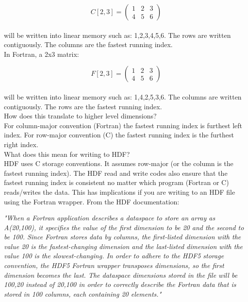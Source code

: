 \documentclass[12pt, letterpaper]{article}
\begin{document}
\[
C[2,3] =
\begin{pmatrix}
1 & 2 & 3 \\
4 & 5 & 6
\end{pmatrix}
\] 
\\

will be written into linear memory such as: 1,2,3,4,5,6. The rows are written contiguously. The columns are the fastest running index.\\

In Fortran, a 2x3 matrix:

\[
F[2,3] =
\begin{pmatrix}
1 & 2 & 3 \\
4 & 5 & 6
\end{pmatrix}
\] 
\\

will be written into linear memory such as: 1,4,2,5,3,6. The columns are written contiguously. The rows are the fastest running index.\\

How does this translate to higher level dimensions?\\

For column-major convention (Fortran) the fastest running index is furthest left index. For row-major convention (C) the fastest running index is the furthest right index.\\

What does this mean for writing to HDF?\\

HDF uses C storage conventions. It assumes row-major (or the column is the fastest running index). The HDF read and write codes also ensure that the fastest running index is consistent no matter which program (Fortran or C) reads/writes the data. This has implications if you are writing to an HDF file using the Fortran wrapper. From the HDF documentation:

\begin{center}
\textit{"When a Fortran application describes a dataspace to store an array as A(20,100), it specifies the value of the first dimension to be 20 and the second to be 100. Since Fortran stores data by columns, the first-listed dimension with the value 20 is the fastest-changing dimension and the last-listed dimension with the value 100 is the slowest-changing. In order to adhere to the HDF5 storage convention, the HDF5 Fortran wrapper transposes dimensions, so the first dimension becomes the last. The dataspace dimensions stored in the file will be 100,20 instead of 20,100 in order to correctly describe the Fortran data that is stored in 100 columns, each containing 20 elements."}
\end{center}
 
\end{document}
